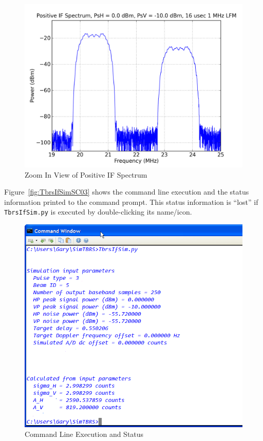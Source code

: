 \documentclass[12pt,english]{article}
\begin{document}
\begin{figure}[ht]
  \noindent \begin{centering}
  \includegraphics[width=4.75in]{IFSpectrumPos_PT3_AH2590_AV819M2.png}\medskip{}
  \caption{Zoom In View of Positive IF Spectrum}
  \label{fig:IFSpectrumPos_PT3_AH2590_AV819M2}
  \par \end{centering}
\end{figure}

Figure~\vref{fig:TbrsIfSimSC03} shows the command line execution and
the status information printed to the command prompt. This status
information is ``lost'' if \texttt{TbrsIfSim.py} is executed by
double-clicking its name/icon.
\begin{figure}[ht]
  \noindent \begin{centering}
  \includegraphics{TbrsIfSimSC03.png}\medskip{}
  \caption{Command Line Execution and Status}
  \label{fig:TbrsIfSimSC03}
  \par \end{centering}
\end{figure}
\end{document}
